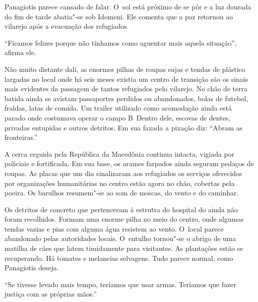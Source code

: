 Panagiotis parece cansado de falar. O~sol está próximo de se pôr e a luz
dourada do fim de tarde abatia"-se sob Idomeni. Ele comenta que a paz
retornou ao vilarejo após a evacuação dos refugiados.

``Ficamos felizes porque não tínhamos como aguentar mais aquela
situação'', afirma ele.

Não muito distante dali, as enormes pilhas de roupas sujas e tendas de
plástico largadas no local onde há seis meses existia um centro de
transição são os sinais mais evidentes da passagem de tantos refugiados
pelo vilarejo. No chão de terra batida ainda se avistam passaportes
perdidos ou abandonados, bolas de futebol, fraldas, latas de comida. Um
trailer utilizado como acomodação ainda está parado onde costumava
operar o campo B\, Dentro dele, escovas de dentes, privadas entupidas e
outros detritos. Em sua faxada a pixação diz: ``Abram as fronteiras.''

A cerca erguida pela República da Macedônia continua intacta, vigiada
por policiais e fortificada. Em sua base, os arames farpados ainda
seguram pedaços de roupas. As placas que um dia sinalizaram aos
refugiados os serviços oferecidos por organizações humanitárias no
centro estão agora no chão, cobertas pela poeira. Os barulhos
resumem"-se ao som de moscas, do vento e do caminhar.

Os detritos de concreto que pertenceram à estrutra do hospital do 
ainda não foram recolhidos. Formam uma enorme pilha no meio do centro,
onde algumas tendas vazias e pias com alguma água resistem ao vento. O~local parece abandonado pelas autoridades locais. O~entulho tornou"-se o
abrigo de uma matilha de cães que latem timidamente para visitantes. As
plantações estão se recuperando. Há tomates e melancias selvagens. Tudo
parece normal, como Panagiotis deseja.

``Se tivesse levado mais tempo, teríamos que usar armas. Teríamos que
fazer justiça com as próprias mãos.''


